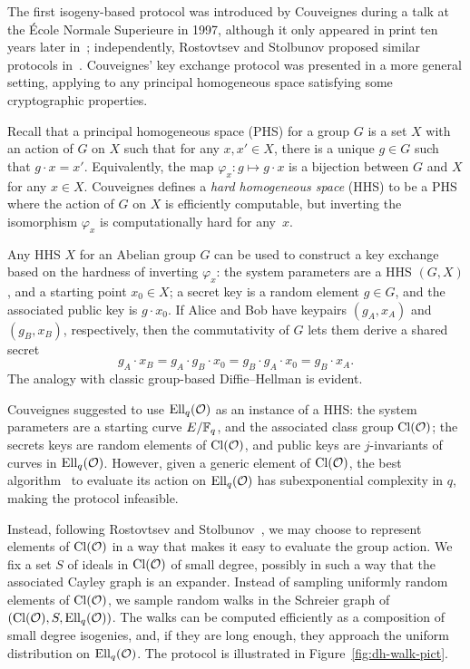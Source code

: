 \documentclass{report}
\theoremstyle{plain}
\theoremstyle{definition}
\begin{document}
The first isogeny-based protocol was introduced by Couveignes during a
talk at the École Normale Superieure in 1997, although it only
appeared in print ten years later in~\cite{cryptoeprint:2006:291};
independently, Rostovtsev and Stolbunov proposed similar protocols
in~\cite{rostovtsev+stolbunov06,Stol}. %
Couveignes' key exchange protocol was presented in a more general
setting, applying to any principal homogeneous space satisfying some
cryptographic properties.

Recall that a principal homogeneous space (PHS) for a group $G$ is a
set $X$ with an action of $G$ on $X$ such that for any $x,x'\in X$,
there is a unique $g\in G$ such that $g\cdot x = x'$. %
Equivalently, the map $φ_x: g\mapsto g\cdot x$ is a bijection between
$G$ and $X$ for any $x\in X$. %
Couveignes defines a \emph{hard homogeneous space} (HHS) to be a PHS
where the action of $G$ on $X$ is efficiently computable, but
inverting the isomorphism $φ_x$ is computationally hard for any~$x$.

Any HHS $X$ for an Abelian group $G$ can be used to construct a key
exchange based on the hardness of inverting $\varphi_x$: the system
parameters are a HHS $(G,X)$, and a starting point $x_0∈X$; a secret
key is a random element $g∈G$, and the associated public key is
$g·x_0$. %
If Alice and Bob have keypairs $(g_A,x_A)$ and $(g_B,x_B)$,
respectively, then the commutativity of $G$ lets them derive a shared
secret
\begin{equation*}
  g_A·x_B = g_A·g_B· x_0 = g_B·g_A·x_0 = g_B·x_A.
\end{equation*}
The analogy with classic group-based Diffie--Hellman is evident.

Couveignes suggested to use $\operatorname{Ell}_q(\mathcal{O})$ as an instance of a HHS: the
system parameters are a starting curve $E/\mathbb{F}_q$, and the associated
class group $\operatorname{Cl}(\mathcal{O})$; the secrets keys are random elements of
$\operatorname{Cl}(\mathcal{O})$, and public keys are $j$-invariants of curves in
$\operatorname{Ell}_q(\mathcal{O})$. %
However, given a generic element of $\operatorname{Cl}(\mathcal{O})$, the best
algorithm~\cite{jao+soukharev10} to evaluate its action on
$\operatorname{Ell}_q(\mathcal{O})$ has subexponential complexity in $q$, making the protocol
infeasible. %

Instead, following Rostovtsev and
Stolbunov~\cite{rostovtsev+stolbunov06}, we may choose to represent
elements of $\operatorname{Cl}(\mathcal{O})$ in a way that makes it easy to evaluate the
group action. %
We fix a set $S$ of ideals in $\operatorname{Cl}(\mathcal{O})$ of small degree, possibly in
such a way that the associated Cayley graph is an expander. %
Instead of sampling uniformly random elements of $\operatorname{Cl}(\mathcal{O})$, we sample
random walks in the Schreier graph of $(\operatorname{Cl}(\mathcal{O}),S,\operatorname{Ell}_q(\mathcal{O}))$. %
The walks can be computed efficiently as a composition of small degree
isogenies, and, if they are long enough, they approach the uniform
distribution on $\operatorname{Ell}_q(\mathcal{O})$. %
The protocol is illustrated in Figure~\ref{fig:dh-walk-pict}. %
\end{document}
